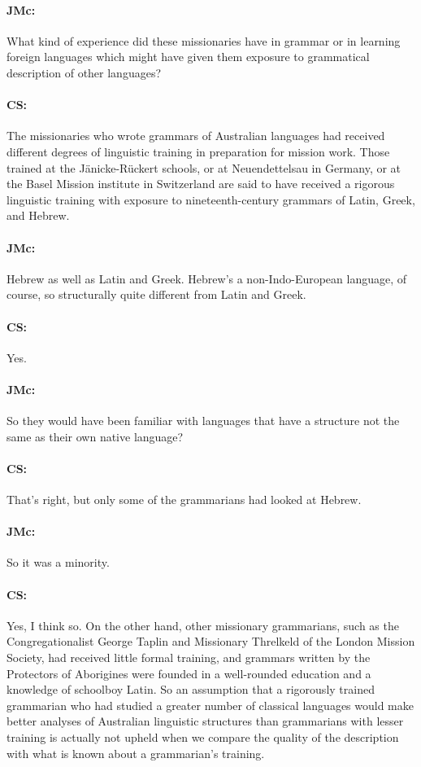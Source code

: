 \documentclass[output=paper]{langscibook}
\begin{document}
\paragraph*{JMc:}  What kind of experience did these missionaries have in grammar or in learning foreign languages which might have given them exposure to grammatical description of other languages?


\paragraph*{CS:}  The missionaries who wrote grammars of Australian languages had received different degrees of linguistic training in preparation for mission work. Those trained at the Jänicke-Rückert schools, or at Neuendettelsau in Germany, or at the Basel Mission institute in Switzerland are said to have received a rigorous linguistic training with exposure to nineteenth-century grammars of Latin, Greek, and Hebrew.


\paragraph*{JMc:}  Hebrew as well as Latin and Greek. Hebrew’s a non-Indo-European language, of course, so structurally quite different from Latin and Greek.


\paragraph*{CS:}  Yes.


\paragraph*{JMc:}  So they would have been familiar with languages that have a structure not the same as their own native language?


\paragraph*{CS:}  That’s right, but only some of the grammarians had looked at Hebrew.


\paragraph*{JMc:}  So it was a minority.


\paragraph*{CS:}  Yes, I think so. On the other hand, other missionary grammarians, such as the Congregationalist George Taplin and Missionary Threlkeld of the London Mission Society, had received little formal training, and grammars written by the Protectors of Aborigines were founded in a well-rounded education and a knowledge of schoolboy Latin. So an assumption that a rigorously trained grammarian who had studied a greater number of classical languages would make better analyses of Australian linguistic structures than grammarians with lesser training is actually not upheld when we compare the quality of the description with what is known about a grammarian’s training.
\end{document}
